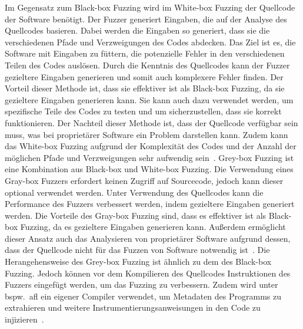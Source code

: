 Im Gegensatz zum Black-box Fuzzing wird im White-box Fuzzing der Quellcode der Software benötigt.
Der Fuzzer generiert Eingaben, die auf der Analyse des Quellcodes basieren.
Dabei werden die Eingaben so generiert, dass sie die verschiedenen Pfade und Verzweigungen des Codes abdecken.
Das Ziel ist es, die Software mit Eingaben zu füttern, die potenzielle Fehler in den verschiedenen Teilen des Codes auslösen.
Durch die Kenntnis des Quellcodes kann der Fuzzer gezieltere Eingaben generieren und somit auch komplexere Fehler finden.
Der Vorteil dieser Methode ist, dass sie effektiver ist als Black-box Fuzzing, da sie gezieltere Eingaben generieren kann.
Sie kann auch dazu verwendet werden, um spezifische Teile des Codes zu testen und um sicherzustellen, dass sie korrekt funktionieren.
Der Nachteil dieser Methode ist, dass der Quellcode verfügbar sein muss, was bei proprietärer Software ein Problem darstellen kann.
Zudem kann das White-box Fuzzing aufgrund der Komplexität des Codes und der Anzahl der möglichen Pfade und Verzweigungen
sehr aufwendig sein~\cite{black-box-fuzzing}.\newline\newline
Grey-box Fuzzing ist eine Kombination aus Black-box und White-box Fuzzing.
Die Verwendung eines Gray-box Fuzzers erfordert keinen Zugriff auf Sourcecode, jedoch kann dieser optional verwendet werden.
Unter Verwendung des Quellcodes kann die Performance des Fuzzers verbessert werden, indem gezieltere Eingaben generiert werden.
Die Vorteile des Gray-box Fuzzing sind, dass es effektiver ist als Black-box Fuzzing, da es gezieltere Eingaben generieren kann.
Außerdem ermöglicht dieser Ansatz auch das Analysieren von proprietärer Software aufgrund dessen, dass der Quellcode nicht für das
Fuzzen von Software notwendig ist~\cite{grey-box-fuzzing}.
Die Herangehensweise des Grey-box Fuzzing ist ähnlich zu dem des Black-box Fuzzing.
Jedoch können vor dem Kompilieren des Quellcodes Instruktionen des Fuzzers eingefügt werden, um das Fuzzing zu verbessern.
Zudem wird unter bspw.\ \gls{afl} ein eigener Compiler verwendet, um Metadaten des Programms zu extrahieren und weitere
Instrumentierungsanweisungen in den Code zu injizieren~\cite{afl-instr}.